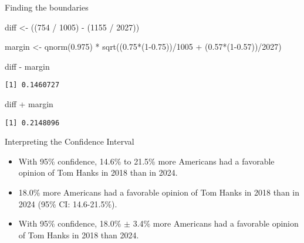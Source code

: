 \documentclass[
  ignorenonframetext,
]{beamer}
\newenvironment{Shaded}{\begin{snugshade}}{\end{snugshade}}
\newcommand{\DecValTok}[1]{\textcolor[rgb]{0.68,0.00,0.00}{#1}}
\newcommand{\FloatTok}[1]{\textcolor[rgb]{0.68,0.00,0.00}{#1}}
\newcommand{\FunctionTok}[1]{\textcolor[rgb]{0.28,0.35,0.67}{#1}}
\newcommand{\NormalTok}[1]{\textcolor[rgb]{0.00,0.23,0.31}{#1}}
\newcommand{\OtherTok}[1]{\textcolor[rgb]{0.00,0.23,0.31}{#1}}
\newcommand{\SpecialCharTok}[1]{\textcolor[rgb]{0.37,0.37,0.37}{#1}}
\providecommand{\tightlist}{%
  \setlength{\itemsep}{0pt}\setlength{\parskip}{0pt}}\usepackage{longtable,booktabs,array}
\begin{document}
\begin{frame}[fragile]{Finding the boundaries}
\label{finding-the-boundaries-1}
\begin{Shaded}
\begin{Highlighting}[]
\NormalTok{diff }\OtherTok{\textless{}{-}}\NormalTok{ ((}\DecValTok{754} \SpecialCharTok{/} \DecValTok{1005}\NormalTok{) }\SpecialCharTok{{-}}\NormalTok{ (}\DecValTok{1155} \SpecialCharTok{/} \DecValTok{2027}\NormalTok{))}

\NormalTok{margin }\OtherTok{\textless{}{-}} \FunctionTok{qnorm}\NormalTok{(}\FloatTok{0.975}\NormalTok{) }\SpecialCharTok{*} \FunctionTok{sqrt}\NormalTok{((}\FloatTok{0.75}\SpecialCharTok{*}\NormalTok{(}\DecValTok{1}\FloatTok{{-}0.75}\NormalTok{))}\SpecialCharTok{/}\DecValTok{1005} \SpecialCharTok{+}\NormalTok{ (}\FloatTok{0.57}\SpecialCharTok{*}\NormalTok{(}\DecValTok{1}\FloatTok{{-}0.57}\NormalTok{))}\SpecialCharTok{/}\DecValTok{2027}\NormalTok{)}

\NormalTok{diff }\SpecialCharTok{{-}}\NormalTok{ margin}
\end{Highlighting}
\end{Shaded}

\begin{verbatim}
[1] 0.1460727
\end{verbatim}

\begin{Shaded}
\begin{Highlighting}[]
\NormalTok{diff }\SpecialCharTok{+}\NormalTok{ margin}
\end{Highlighting}
\end{Shaded}

\begin{verbatim}
[1] 0.2148096
\end{verbatim}
\end{frame}

\begin{frame}{Interpreting the Confidence Interval}
\label{interpreting-the-confidence-interval-1}
\begin{itemize}
\tightlist
\item
  With 95\% confidence, 14.6\% to 21.5\% more Americans had a favorable
  opinion of Tom Hanks in 2018 than in 2024.
\end{itemize}

\pause

\begin{itemize}
\tightlist
\item
  18.0\% more Americans had a favorable opinion of Tom Hanks in 2018
  than in 2024 (95\% CI: 14.6-21.5\%).
\end{itemize}

\pause

\begin{itemize}
\tightlist
\item
  With 95\% confidence, 18.0\% \(\pm\) 3.4\% more Americans had a
  favorable opinion of Tom Hanks in 2018 than 2024.
\end{itemize}
\end{frame}
\end{document}
